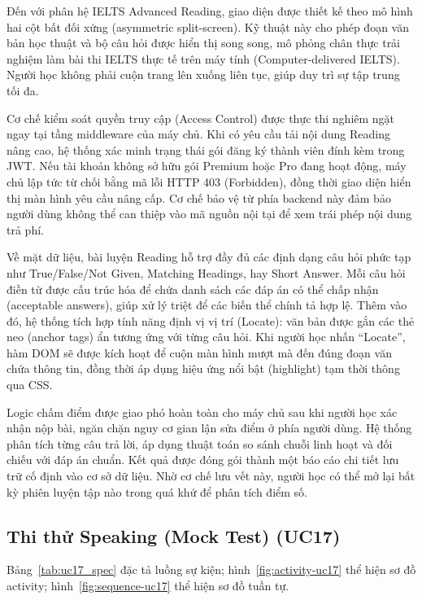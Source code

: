Đến với phân hệ IELTS Advanced Reading, giao diện được thiết kế theo mô hình hai cột bất đối xứng (asymmetric split-screen). Kỹ thuật này cho phép đoạn văn bản học thuật và bộ câu hỏi được hiển thị song song, mô phỏng chân thực trải nghiệm làm bài thi IELTS thực tế trên máy tính (Computer-delivered IELTS). Người học không phải cuộn trang lên xuống liên tục, giúp duy trì sự tập trung tối đa.

Cơ chế kiểm soát quyền truy cập (Access Control) được thực thi nghiêm ngặt ngay tại tầng middleware của máy chủ. Khi có yêu cầu tải nội dung Reading nâng cao, hệ thống xác minh trạng thái gói đăng ký thành viên đính kèm trong JWT. Nếu tài khoản không sở hữu gói Premium hoặc Pro đang hoạt động, máy chủ lập tức từ chối bằng mã lỗi HTTP 403 (Forbidden), đồng thời giao diện hiển thị màn hình yêu cầu nâng cấp. Cơ chế bảo vệ từ phía backend này đảm bảo người dùng không thể can thiệp vào mã nguồn nội tại để xem trái phép nội dung trả phí.

\begin{sloppypar}
Về mặt dữ liệu, bài luyện Reading hỗ trợ đầy đủ các định dạng câu hỏi phức tạp như True/False/Not Given, Matching Headings, hay Short Answer. Mỗi câu hỏi điền từ được cấu trúc hóa để chứa danh sách các đáp án có thể chấp nhận (acceptable answers), giúp xử lý triệt để các biến thể chính tả hợp lệ. Thêm vào đó, hệ thống tích hợp tính năng định vị vị trí (Locate): văn bản được gắn các thẻ neo (anchor tags) ẩn tương ứng với từng câu hỏi. Khi người học nhấn ``Locate'', hàm DOM sẽ được kích hoạt để cuộn màn hình mượt mà đến đúng đoạn văn chứa thông tin, đồng thời áp dụng hiệu ứng nổi bật (highlight) tạm thời thông qua CSS.
\end{sloppypar}

\begin{sloppypar}
Logic chấm điểm được giao phó hoàn toàn cho máy chủ sau khi người học xác nhận nộp bài, ngăn chặn nguy cơ gian lận sửa điểm ở phía người dùng. Hệ thống phân tích từng câu trả lời, áp dụng thuật toán so sánh chuỗi linh hoạt và đối chiếu với đáp án chuẩn. Kết quả được đóng gói thành một báo cáo chi tiết lưu trữ cố định vào cơ sở dữ liệu. Nhờ cơ chế lưu vết này, người học có thể mở lại bất kỳ phiên luyện tập nào trong quá khứ để phân tích điểm số.
\end{sloppypar}

\subsection{Thi thử Speaking (Mock Test) (UC17)}
Bảng~\ref{tab:uc17_spec} đặc tả luồng sự kiện; hình~\ref{fig:activity-uc17} thể hiện sơ đồ activity; hình~\ref{fig:sequence-uc17} thể hiện sơ đồ tuần tự.
